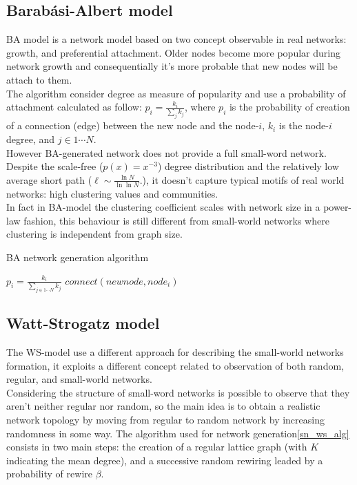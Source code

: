 \subsection{Barabási-Albert model}
\label{sn_ba_model}
BA model\cite{citeulike:90557} is a network model based on two concept observable in real networks: growth, and preferential attachment. Older nodes become more popular during network growth and consequentially it's more probable that new nodes will be attach to them.\\
The algorithm consider degree as measure of popularity and use a probability of attachment calculated as follow: $p_{i} = \frac{k_{i}}{\sum_{j} k_{j}}$, where $p_i$ is the probability of creation of a connection (edge) between the new node and the node-$i$, $k_{i}$ is the node-$i$ degree, and $j \in 1 \cdots N$.\\
However BA-generated network does not provide a full small-word network. Despite the scale-free ($p(x)=x^{-3}$) degree distribution and the relatively low average short path ($\ell\sim\frac{\ln N}{\ln \ln N}. $), it doesn't capture typical motifs of real world networks: high clustering values and communities.\\
In fact in BA-model the clustering coefficient scales with network size in a power-law fashion, this behaviour is still different from small-world networks where clustering is independent from graph size.

\begin{algorithm}
\caption{BA network generation algorithm}
\label{sn_ba_alg}
\begin{algorithmic}
	\STATE $p_{i} = \frac{k_{i}}{\sum_{j \in 1\cdots N} k_{j}}$
	 	\STATE $connect(newnode,node_{i})$
 	\ENDIF
\ENDFOR
\end{algorithmic}
\end{algorithm}

\subsection{Watt-Strogatz model}
\label{sn_ws_model}
The WS-model\cite{citeulike:1580006} use a different approach for describing the small-world networks formation, it exploits a different concept related to observation of both random, regular, and small-world networks.\\
Considering the structure of small-word networks is possible to observe that they aren't neither regular nor random, so the main idea is to obtain a realistic network topology by moving from regular to random network by increasing randomness  in some way. The algorithm used for network generation\ref{sn_ws_alg} consists in two main steps: the creation of a regular lattice graph (with $K$ indicating the mean degree), and a successive random rewiring leaded by a probability of rewire $\beta$.

